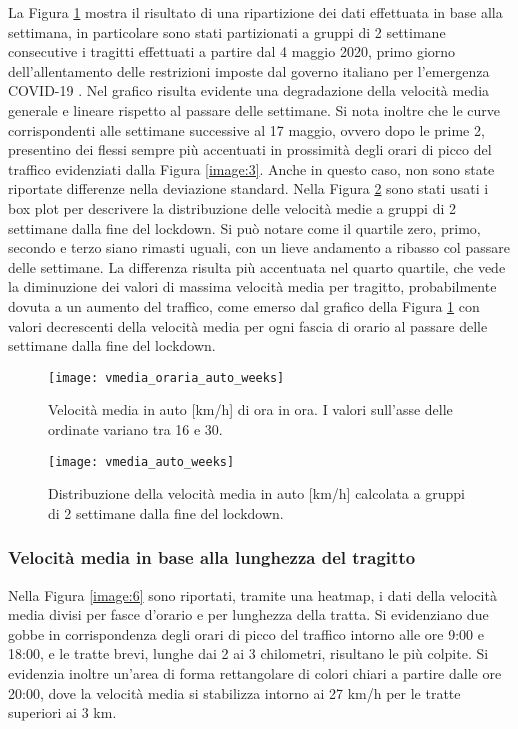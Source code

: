 La Figura \ref{image:5} mostra il risultato di una ripartizione dei dati effettuata in base alla settimana, in particolare sono stati partizionati a gruppi di 2 settimane consecutive i tragitti effettuati a partire dal 4 maggio 2020, primo giorno dell'allentamento delle restrizioni imposte dal governo italiano per l'emergenza COVID-19 \cite{misuredelgovernopercovid}. Nel grafico risulta evidente una degradazione della velocità media generale e lineare rispetto al passare delle settimane. Si nota inoltre che le curve corrispondenti alle settimane successive al 17 maggio, ovvero dopo le prime 2, presentino dei flessi sempre più accentuati in prossimità degli orari di picco del traffico evidenziati dalla Figura \ref{image:3}. Anche in questo caso, non sono state riportate differenze nella deviazione standard. Nella Figura \ref{image:27} sono stati usati i box plot per descrivere la distribuzione delle velocità medie a gruppi di 2 settimane dalla fine del lockdown. Si può notare come il quartile zero, primo, secondo e terzo siano rimasti uguali, con un lieve andamento a ribasso col passare delle settimane. La differenza risulta più accentuata nel quarto quartile, che vede la diminuzione dei valori di massima velocità media per tragitto, probabilmente dovuta a un aumento del traffico, come emerso dal grafico della Figura \ref{image:5} con valori decrescenti della velocità media per ogni fascia di orario al passare delle settimane dalla fine del lockdown.

\begin{figure}
	\centering
	\texttt{[image: vmedia\_oraria\_auto\_weeks]}
	\caption{Velocità media in auto [km/h] di ora in ora. I valori sull'asse delle ordinate variano tra 16 e 30.}
	\label{image:5}
\end{figure}

\begin{figure}
	\centering
	\texttt{[image: vmedia\_auto\_weeks]}
	\caption{Distribuzione della velocità media in auto [km/h] calcolata a gruppi di 2 settimane dalla fine del lockdown.}
	\label{image:27}
\end{figure}

\subsubsection{Velocità media in base alla lunghezza del tragitto}

Nella Figura \ref{image:6} sono riportati, tramite una heatmap, i dati della velocità media divisi per fasce d'orario e per lunghezza della tratta. Si evidenziano due gobbe in corrispondenza degli orari di picco del traffico intorno alle ore 9:00 e 18:00, e le tratte brevi, lunghe dai 2 ai 3 chilometri, risultano le più colpite. Si evidenzia inoltre un'area di forma rettangolare di colori chiari a partire dalle ore 20:00, dove la velocità media si stabilizza intorno ai 27 km/h per le tratte superiori ai 3 km.

